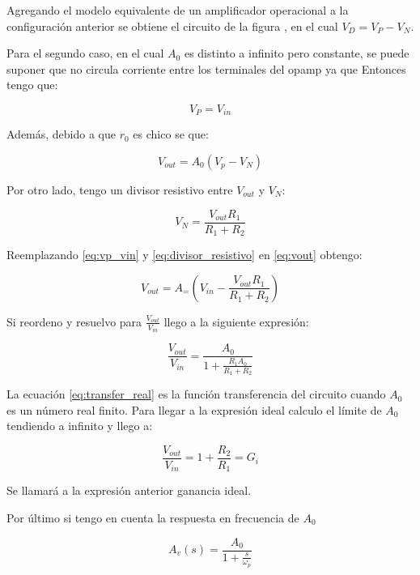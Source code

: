 Agregando el modelo equivalente de un amplificador operacional a la configuración anterior se obtiene el circuito de la figura %
, en el cual $V_D = V_P - V_N$. 


Para el segundo caso, en el cual $A_0$ es distinto a infinito pero constante, se puede suponer que no circula corriente entre los terminales del opamp ya que %
Entonces tengo que:

\begin{equation}
	V_P = V_{in} 
	\label{eq:vp_vin}
\end{equation} 

Además, debido a que $r_0$ es chico %
se que:

\begin{equation}
	V_{out} = A_0(V_p - V_N)
	\label{eq:vout}
\end{equation}

Por otro lado, tengo un divisor resistivo entre $V_{out}$ y $V_N$:

\begin{equation}
	V_N = \frac{V_{out}R_1}{R_1 + R_2}
	\label{eq:divisor_resistivo}
\end{equation}

Reemplazando \ref{eq:vp_vin} y \ref{eq:divisor_resistivo} en \ref{eq:vout} obtengo:

\begin{equation}
	V_{out} = A_=(V_{in} - \frac{V_{out}R_1}{R_1 + R_2})
	\label{eq:transfer_real_intermedio}
\end{equation}

Si reordeno y resuelvo para $\frac{V_{out}}{V_{in}}$ llego a la siguiente expresión:

\begin{equation}
	\frac{V_{out}}{V_{in}} = \frac{A_0}{1 + \frac{R_1A_0}{R_1 + R_2}}
	\label{eq:transfer_real}
\end{equation}

La ecuación \ref{eq:transfer_real} es la función transferencia del circuito cuando $A_0$ es un número real finito. Para llegar a la expresión ideal calculo el límite de $A_0$ tendiendo a infinito y llego a:

\begin{equation}
	\frac{V_{out}}{V_{in}} = 1 + \frac{R_2}{R_1} = G_i
	\label{eq:ganancia_ideal}
\end{equation}

Se llamará a la expresión anterior ganancia ideal.

Por último si tengo en cuenta la respuesta en frecuencia de $A_0$

\begin{equation}
	A_v(s) = \frac{A_0}{1 + \frac{s}{\omega_p}}
	\label{eq:rta_frec_Av}
\end{equation}

